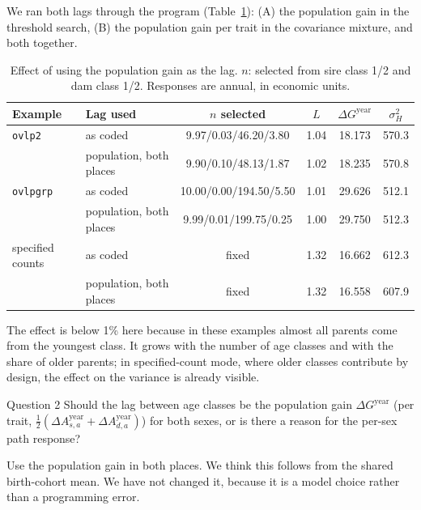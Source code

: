 \documentclass[11pt]{article}
\newcommand{\src}[1]{\texttt{#1}}
\begin{document}
We ran both lags through the program (Table~\ref{tab:lag}): (A) the population gain in the threshold search, (B) the population gain per trait in the covariance mixture, and both together.

\begin{table}[ht]
\centering\small
\caption{Effect of using the population gain as the lag. $n$: selected from sire class 1/2 and dam class 1/2. Responses are annual, in economic units.}\label{tab:lag}
\setlength{\tabcolsep}{4pt}
\begin{tabular}{llcccc}\toprule
Example & Lag used & $n$ selected & $L$ & $\Delta G^{\mathrm{year}}$ & $\sigma_H^2$\\\midrule
\src{ovlp2} & as coded & 9.97/0.03/46.20/3.80 & 1.04 & 18.173 & 570.3\\
 & population, both places & 9.90/0.10/48.13/1.87 & 1.02 & 18.235 & 570.8\\
\src{ovlpgrp} & as coded & 10.00/0.00/194.50/5.50 & 1.01 & 29.626 & 512.1\\
 & population, both places & 9.99/0.01/199.75/0.25 & 1.00 & 29.750 & 512.3\\
specified counts & as coded & fixed & 1.32 & 16.662 & 612.3\\
 & population, both places & fixed & 1.32 & 16.558 & 607.9\\\bottomrule
\end{tabular}
\end{table}

The effect is below 1\% here because in these examples almost all parents come from the youngest class. It grows with the number of age classes and with the share of older parents; in specified-count mode, where older classes contribute by design, the effect on the variance is already visible.

\begin{question}{Question 2}
Should the lag between age classes be the population gain $\Delta G^{\mathrm{year}}$ (per trait, $\tfrac12(\Delta A_{s,a}^{\mathrm{year}}+\Delta A_{d,a}^{\mathrm{year}})$) for both sexes, or is there a reason for the per-sex path response?
\end{question}
\begin{recommend}
Use the population gain in both places. We think this follows from the shared birth-cohort mean. We have not changed it, because it is a model choice rather than a programming error.
\end{recommend}
\end{document}

